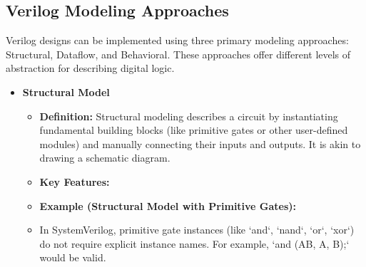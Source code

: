 \documentclass{article}
\begin{document}
\begin{itemize}
\subsection{Verilog Modeling Approaches}

Verilog designs can be implemented using three primary modeling approaches: Structural, Dataflow, and Behavioral. These approaches offer different levels of abstraction for describing digital logic.

\begin{itemize}
    \item \textbf{Structural Model}
    
    \begin{itemize}
        \item \textbf{Definition:} Structural modeling describes a circuit by instantiating fundamental building blocks (like primitive gates or other user-defined modules) and manually connecting their inputs and outputs. It is akin to drawing a schematic diagram.
        \item \textbf{Key Features:}
        
        \item \textbf{Example (Structural Model with Primitive Gates):}
        
        \item In SystemVerilog, primitive gate instances (like `and`, `nand`, `or`, `xor`) do not require explicit instance names. For example, `and (AB, A, B);` would be valid.
    \end{itemize}
    

\end{itemize}
\end{itemize}
\end{document}

